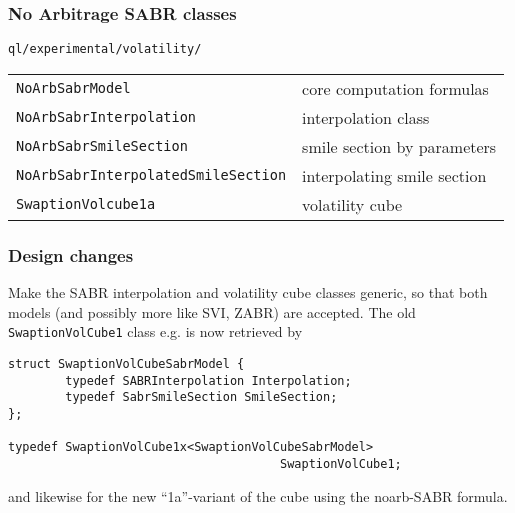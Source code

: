 \documentclass{beamer}
\begin{document}

\begin{frame}[fragile]
\frametitle{No Arbitrage SABR classes}

\verb+ql/experimental/volatility/+

\begin{table}
\begin{tabular}{l|l}
\verb+NoArbSabrModel+ & core computation formulas \\
\verb+NoArbSabrInterpolation+ & interpolation class \\
\verb+NoArbSabrSmileSection+ & smile section by parameters \\
\verb+NoArbSabrInterpolatedSmileSection+ & interpolating smile section \\
\verb+SwaptionVolcube1a+ & volatility cube 
\end{tabular}
\end{table}
\end{frame}

\begin{frame}[fragile]
\frametitle{Design changes}
Make the SABR interpolation and volatility cube classes generic, so that both models (and possibly more like SVI, ZABR) are accepted. The old \verb+SwaptionVolCube1+ class e.g. is now retrieved by 
\begin{verbatim}
struct SwaptionVolCubeSabrModel {
        typedef SABRInterpolation Interpolation;
        typedef SabrSmileSection SmileSection;
};

typedef SwaptionVolCube1x<SwaptionVolCubeSabrModel> 
                                      SwaptionVolCube1;

\end{verbatim}
and likewise for the new ``1a''-variant of the cube using the noarb-SABR formula.
\end{frame}

\end{document}
